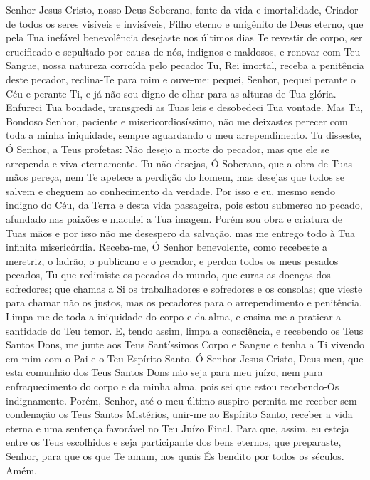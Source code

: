 \documentclass{subfiles}
\begin{document}
Senhor Jesus Cristo, nosso Deus Soberano, fonte da vida e imortalidade, Criador
de todos os seres visíveis e invisíveis, Filho eterno e unigênito de Deus
eterno, que pela Tua inefável benevolência desejaste nos últimos dias Te
revestir de corpo, ser crucificado e sepultado por causa de nós, indignos e
maldosos, e renovar com Teu Sangue, nossa natureza corroída pelo pecado: Tu, Rei
imortal, receba a penitência deste pecador, reclina-Te para mim e ouve-me:
pequei, Senhor, pequei perante o Céu e perante Ti, e já não sou digno de olhar
para as alturas de Tua glória. Enfureci Tua bondade, transgredi as Tuas leis e
desobedeci Tua vontade. Mas Tu, Bondoso Senhor, paciente e misericordiosíssimo,
não me deixastes perecer com toda a minha iniquidade, sempre aguardando o meu
arrependimento. Tu disseste, Ó Senhor, a Teus profetas: Não desejo a morte do
pecador, mas que ele se arrependa e viva eternamente. Tu não desejas, Ó
Soberano, que a obra de Tuas mãos pereça, nem Te apetece a perdição do homem,
mas desejas que todos se salvem e cheguem ao conhecimento da verdade. Por isso e
eu, mesmo sendo indigno do Céu, da Terra e desta vida passageira, pois estou
submerso no pecado, afundado nas paixões e maculei a Tua imagem. Porém sou obra
e criatura de Tuas mãos e por isso não me desespero da salvação, mas me entrego
todo à Tua infinita misericórdia. Receba-me, Ó Senhor benevolente, como
recebeste a meretriz, o ladrão, o publicano e o pecador, e perdoa todos os meus
pesados pecados, Tu que redimiste os pecados do mundo, que curas as doenças dos
sofredores; que chamas a Si os trabalhadores e sofredores e os consolas; que
vieste para chamar não os justos, mas os pecadores para o arrependimento e
penitência. Limpa-me de toda a iniquidade do corpo e da alma, e ensina-me a
praticar a santidade do Teu temor. E, tendo assim, limpa a consciência, e
recebendo os Teus Santos Dons, me junte aos Teus Santíssimos Corpo e Sangue e
tenha a Ti vivendo em mim com o Pai e o Teu Espírito Santo. Ó Senhor Jesus
Cristo, Deus meu, que esta comunhão dos Teus Santos Dons não seja para meu
juízo, nem para enfraquecimento do corpo e da minha alma, pois sei que estou
recebendo-Os indignamente. Porém, Senhor, até o meu último suspiro permita-me
receber sem condenação os Teus Santos Mistérios, unir-me ao Espírito Santo,
receber a vida eterna e uma sentença favorável no Teu Juízo Final. Para que,
assim, eu esteja entre os Teus escolhidos e seja participante dos bens eternos,
que preparaste, Senhor, para que os que Te amam, nos quais És bendito por todos
os séculos. Amém.
\end{document}
